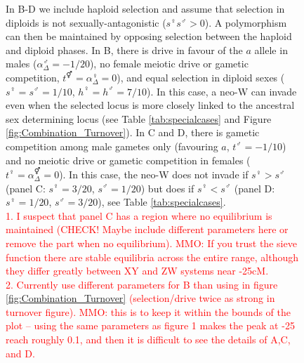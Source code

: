 \documentclass[12pt]{article}
\begin{document}
\begin{figure}[!h]
{In B-D we include haploid selection and assume that selection in diploids is not sexually-antagonistic ($s^\female s^\male>0$). 
A polymorphism can then be maintained by opposing selection between the haploid and diploid phases. 
In B, there is drive in favour of the $a$ allele in males ($\alpha^\male_{\Delta}=-1/20$), no female meiotic drive or gametic competition, $t^\Hermaphrodite=\alpha^\female_{\Delta}=0$), and equal selection in diploid sexes ($s^\female=s^\male=1/10$, $h^\female=h^\male=7/10$). 
In this case, a neo-W can invade even when the selected locus is more closely linked to the ancestral sex determining locus (see Table \ref{tab:specialcases} and Figure \ref{fig:Combination_Turnover}). 
In C and D, there is gametic competition among male gametes only (favouring $a$, $t^\male=-1/10$) and no meiotic drive or gametic competition in females ($t^\female=\alpha^\Hermaphrodite_{\Delta}=0$). 
In this case, the neo-W does not invade if $s^\female>s^\male$ (panel C: $s^\female=3/20$, $s^\male=1/20$) but does if $s^\female<s^\male$ (panel D: $s^\female=1/20$, $s^\male=3/20$), see Table \ref{tab:specialcases}.\\
\textcolor{red}{
1. I suspect that panel C has a region where no equilibrium is maintained (CHECK! Maybe include different parameters here or remove the part when no equilibrium). MMO: If you trust the sieve function there are stable equilibria across the entire range, although they differ greatly between XY and ZW systems near -25cM.
\\
2. Currently use different parameters for B than using in figure \ref{fig:Combination_Turnover} (selection/drive twice as strong in turnover figure). MMO: this is to keep it within the bounds of the plot -- using the same parameters as figure 1 makes the peak at -25 reach roughly 0.1, and then it is difficult to see the details of A,C, and D.
}
}
\label{fig:Combination_Centimorgans}
\end{figure}
\newpage
\end{document}
